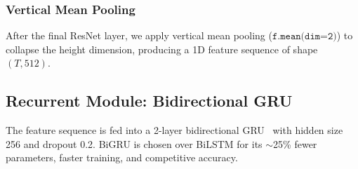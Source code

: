 \documentclass[conference]{IEEEtran}
\begin{document}
\subsubsection{Vertical Mean Pooling}

After the final ResNet layer, we apply vertical mean pooling
($\texttt{f.mean(dim=2)}$) to collapse the height dimension, producing a 1D
feature sequence of shape $(T, 512)$.

\subsection{Recurrent Module: Bidirectional GRU}

The feature sequence is fed into a 2-layer bidirectional GRU~\cite{cho2014}
with hidden size 256 and dropout 0.2. BiGRU is chosen over BiLSTM for its
$\sim$25\% fewer parameters, faster training, and competitive accuracy.
\end{document}
